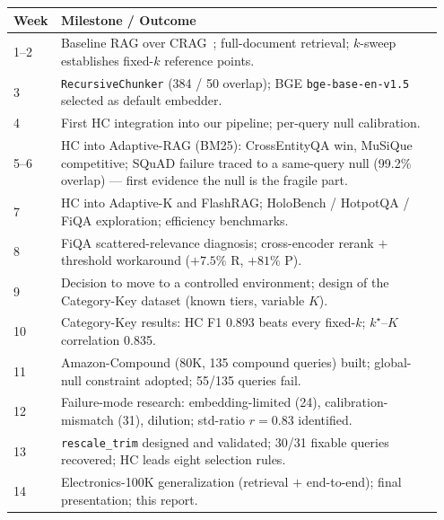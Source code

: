 \documentclass[letterpaper]{article}
\newcommand{\CatHCF}{0.893}
\newcommand{\CatCorrK}{0.835}
\newcommand{\Nfail}{55}
\newcommand{\Nirr}{24}
\newcommand{\Nfix}{31}
\newcommand{\StdR}{0.83}
\begin{document}
\begin{center}
\small
\begin{tabular}{p{0.07\linewidth}p{0.88\linewidth}}
\hline
Week & Milestone / Outcome \\
\hline
1--2  & Baseline RAG over CRAG~\cite{crag2024}; full-document retrieval; $k$-sweep establishes fixed-$k$ reference points. \\
3     & \texttt{RecursiveChunker} (384 / 50 overlap); BGE \texttt{bge-base-en-v1.5} selected as default embedder. \\
4     & First HC integration into our pipeline; per-query null calibration. \\
5--6  & HC into Adaptive-RAG (BM25): CrossEntityQA win, MuSiQue competitive; SQuAD failure traced to a same-query null (99.2\% overlap) --- first evidence the null is the fragile part. \\
7     & HC into Adaptive-K and FlashRAG; HoloBench / HotpotQA / FiQA exploration; efficiency benchmarks. \\
8     & FiQA scattered-relevance diagnosis; cross-encoder rerank $+$ threshold workaround ($+7.5\%$ R, $+81\%$ P). \\
9     & Decision to move to a controlled environment; design of the Category-Key dataset (known tiers, variable $K$). \\
10    & Category-Key results: HC F1 \CatHCF{} beats every fixed-$k$; $k^\star$--$K$ correlation \CatCorrK. \\
11    & Amazon-Compound (80K, 135 compound queries) built; global-null constraint adopted; \Nfail{}/135 queries fail. \\
12    & Failure-mode research: embedding-limited (\Nirr), calibration-mismatch (\Nfix), dilution; std-ratio $r\!=\!\StdR$ identified. \\
13    & \texttt{rescale\_trim} designed and validated; 30/\Nfix{} fixable queries recovered; HC leads eight selection rules. \\
14    & Electronics-100K generalization (retrieval $+$ end-to-end); final presentation; this report. \\
\hline
\end{tabular}
\end{center}
\end{document}
